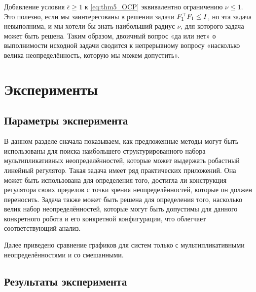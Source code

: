 \begin{remark}
	\label{rm:nu_trick}
	Добавление условия $\bar{\epsilon}\geq 1$ к \eqref{eq:thm5_OCP} эквивалентно ограничению $\nu \leq 1$. Это полезно, если мы заинтересованы в решении задачи ${F}_1^\top{F}_1 \leq {I}$, но эта задача невыполнима, и мы хотели бы знать наибольший радиус $\nu$, для которого задача может быть решена. Таким образом, двоичный вопрос «да или нет» о выполнимости исходной задачи сводится к непрерывному вопросу «насколько велика неопределённость, которую мы можем допустить».
\end{remark}

\section{Эксперименты}\label{sec:ch4/sect3}

\subsection{Параметры эксперимента}\label{sec:ch4/sect3/sub1}

В данном разделе сначала показываем, как предложенные методы могут быть использованы для поиска наибольшего структурированного набора мультипликативных неопределённостей, которые может выдержать робастный линейный регулятор. Такая задача имеет ряд практических приложений. Она может быть использована для определения того, достигла ли конструкция регулятора своих пределов с точки зрения неопределённостей, которые он должен переносить. Задача также может быть решена для определения того, насколько велик набор неопределённостей, которые могут быть допустимы для данного конкретного робота и его конкретной конфигурации, что облегчает соответствующий анализ.

Далее приведено сравнение графиков для систем только с мультипликативными неопределённостями и со смешанными.
\subsection{Результаты эксперимента}\label{sec:ch4/sect3/sub2}

